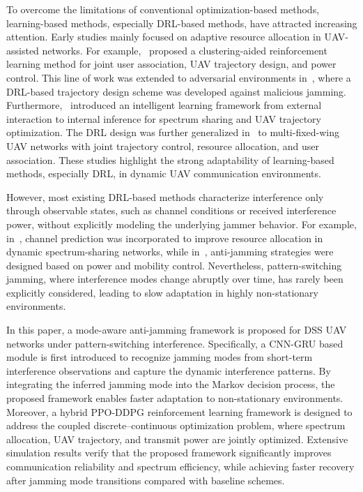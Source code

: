 \documentclass[conference]{IEEEtran}
\begin{document}
To overcome the limitations of conventional optimization-based methods, learning-based methods, especially DRL-based methods, have attracted increasing attention.
Early studies mainly focused on adaptive resource allocation in UAV-assisted networks. 
For example,~\cite{9826431} proposed a clustering-aided reinforcement learning method for joint user association, UAV trajectory design, and power control. 
This line of work was extended to adversarial environments in~\cite{10419848}, where a DRL-based trajectory design scheme was developed against malicious jamming. 
Furthermore,~\cite{10506094} introduced an intelligent learning framework from external interaction to internal inference for spectrum sharing and UAV trajectory optimization. 
The DRL design was further generalized in~\cite{10536060} to multi-fixed-wing UAV networks with joint trajectory control, resource allocation, and user association. 
These studies highlight the strong adaptability of learning-based methods, especially DRL, in dynamic UAV communication environments.

However, most existing DRL-based methods characterize interference only through observable states, 
such as channel conditions or received interference power, without explicitly modeling the underlying jammer behavior. 
For example, in~\cite{10623083}, channel prediction was incorporated to improve resource allocation in dynamic spectrum-sharing networks, 
while in~\cite{9992013}, anti-jamming strategies were designed based on power and mobility control. 
Nevertheless, pattern-switching jamming, where interference modes change abruptly over time, 
has rarely been explicitly considered, leading to slow adaptation in highly non-stationary environments.  

In this paper, a mode-aware anti-jamming framework is proposed for DSS UAV networks under pattern-switching interference. 
Specifically, a CNN-GRU based module is first introduced to recognize jamming modes from short-term interference observations and 
capture the dynamic interference patterns.
By integrating the inferred jamming mode into the Markov decision process, the proposed framework enables faster adaptation to non-stationary environments.
Moreover, a hybrid PPO-DDPG reinforcement learning framework is designed to address the coupled discrete–continuous optimization problem, 
where spectrum allocation, UAV trajectory, and transmit power are jointly optimized.
Extensive simulation results verify that the proposed framework significantly improves communication reliability and spectrum efficiency, 
while achieving faster recovery after jamming mode transitions compared with baseline schemes.
\end{document}
